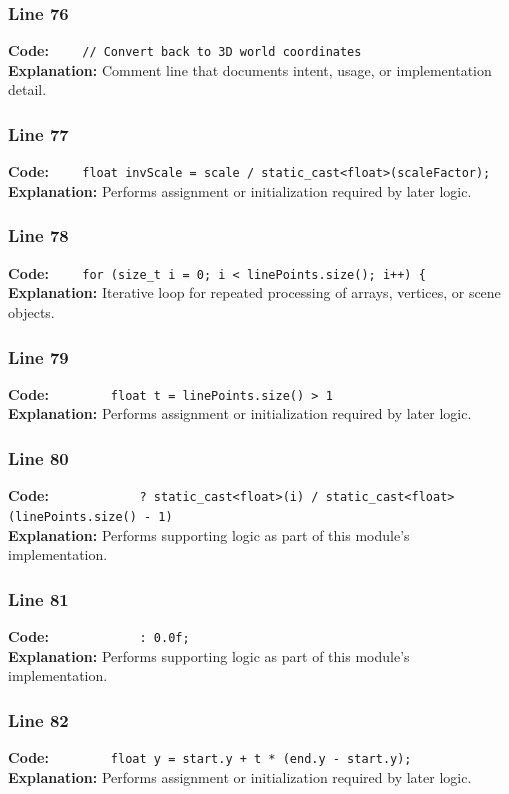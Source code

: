 \documentclass[11pt,a4paper]{article}
\begin{document}
\subsubsection*{Line 76}
\textbf{Code:} \verb|    // Convert back to 3D world coordinates|\\
\textbf{Explanation:} Comment line that documents intent, usage, or implementation detail.

\subsubsection*{Line 77}
\textbf{Code:} \verb|    float invScale = scale / static_cast<float>(scaleFactor);|\\
\textbf{Explanation:} Performs assignment or initialization required by later logic.

\subsubsection*{Line 78}
\textbf{Code:} \verb|    for (size_t i = 0; i < linePoints.size(); i++) {|\\
\textbf{Explanation:} Iterative loop for repeated processing of arrays, vertices, or scene objects.

\subsubsection*{Line 79}
\textbf{Code:} \verb|        float t = linePoints.size() > 1|\\
\textbf{Explanation:} Performs assignment or initialization required by later logic.

\subsubsection*{Line 80}
\textbf{Code:} \verb|            ? static_cast<float>(i) / static_cast<float>(linePoints.size() - 1)|\\
\textbf{Explanation:} Performs supporting logic as part of this module's implementation.

\subsubsection*{Line 81}
\textbf{Code:} \verb|            : 0.0f;|\\
\textbf{Explanation:} Performs supporting logic as part of this module's implementation.

\subsubsection*{Line 82}
\textbf{Code:} \verb|        float y = start.y + t * (end.y - start.y);|\\
\textbf{Explanation:} Performs assignment or initialization required by later logic.
\end{document}
